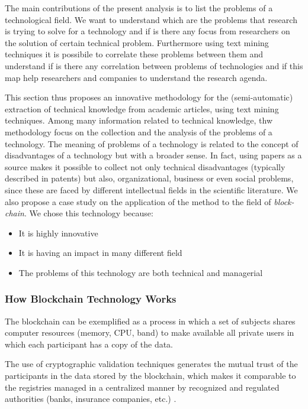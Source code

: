 \documentclass[]{book}
\providecommand{\tightlist}{%
  \setlength{\itemsep}{0pt}\setlength{\parskip}{0pt}}
\begin{document}
The main contributions of the present analysis is to list the problems
of a technological field. We want to understand which are the problems
that research is trying to solve for a technology and if is there any
focus from researchers on the solution of certain technical problem.
Furthermore using text mining techniques it is possibile to correlate
these problems between them and understand if is there any correlation
between problems of technologies and if this map help researchers and
companies to understand the research agenda.

This section thus proposes an innovative methodology for the
(semi-automatic) extraction of technical knowledge from academic
articles, using text mining techniques. Among many information related
to technical knowledge, thw methodology focus on the collection and the
analysis of the problems of a technology. The meaning of problems of a
technology is related to the concept of disadvantages of a technology
but with a broader sense. In fact, using papers as a source makes it
possible to collect not only technical disadvantages (typically
described in patents) but also, organizational, business or even social
problems, since these are faced by different intellectual fields in the
scientific literature. We also propose a case study on the application
of the method to the field of \emph{block-chain}. We chose this
technology because:

\begin{itemize}
\tightlist
\item
  It is highly innovative
\item
  It is having an impact in many different field
\item
  The problems of this technology are both technical and managerial
\end{itemize}

\subsubsection*{How Blockchain Technology
Works}\label{how-blockchain-technology-works}

The blockchain can be exemplified as a process in which a set of
subjects shares computer resources (memory, CPU, band) to make available
all private users in which each participant has a copy of the data.

The use of cryptographic validation techniques generates the mutual
trust of the participants in the data stored by the blockchain, which
makes it comparable to the registries managed in a centralized manner by
recognized and regulated authorities (banks, insurance companies, etc.)
\citep{pilkington201611}.
\end{document}
